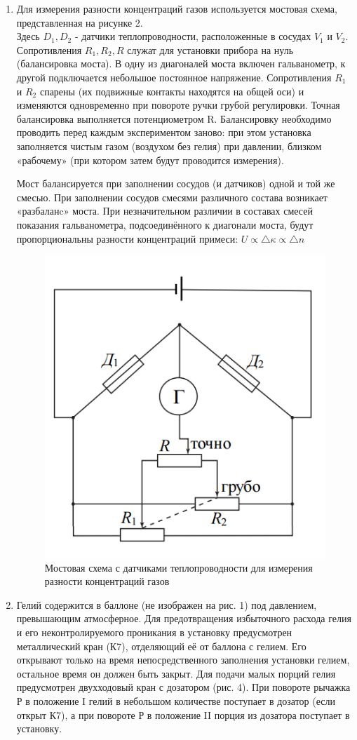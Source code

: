 \documentclass{article}
\begin{document}
\begin{enumerate}
\item Для измерения разности концентраций газов используется мостовая схема, представленная на рисунке 2. \\
Здесь $D_1, D_2$ - датчики теплопроводности, расположенные в сосудах $V_1$ и $V_2$. Сопротивления $R_1, R_2, R$ служат для установки прибора на нуль (балансировка моста). В одну из диагоналей моста включен гальванометр, к другой подключается небольшое постоянное напряжение. Сопротивления $R_1$ и $R_2$ спарены (их подвижные контакты находятся на общей оси) и изменяются одновременно при повороте ручки грубой регулировки. Точная балансировка выполняется потенциометром R. Балансировку необходимо проводить перед каждым экспериментом заново: при этом установка заполняется чистым газом (воздухом без гелия) при давлении, близком «рабочему» (при котором затем будут проводится измерения).

 Мост балансируется при заполнении сосудов (и датчиков) одной и той же смесью. При заполнении сосудов смесями различного состава возникает «разбаланc» моста. При незначительном различии в составах смесей показания гальванометра, подсоединённого к диагонали моста, будут пропорциональны разности концентраций примеси: $U \propto \triangle \kappa \propto \triangle n$
 
\begin{figure}[h]
    \centering
    \includegraphics[width=5.5 cm]{scheme.PNG}
    \caption{Мостовая схема с датчиками теплопроводности для измерения разности концентраций газов}
    \label{fig:vac}
\end{figure} 

\item Гелий содержится в баллоне (не изображен на рис. 1) под давлением, превышающим атмосферное. Для предотвращения избыточного расхода гелия и
его неконтролируемого проникания в установку предусмотрен металлический кран (К7), отделяющий её от баллона с гелием. Его открывают только на
время непосредственного заполнения установки гелием, остальное время он должен быть закрыт. Для подачи малых порций гелия предусмотрен двухходовый кран с дозатором (рис. 4). При повороте рычажка Р в положение I гелий в небольшом количестве поступает в дозатор (если открыт К7), а при повороте Р в положение II порция из дозатора поступает в установку.


\end{enumerate}
\end{document}
